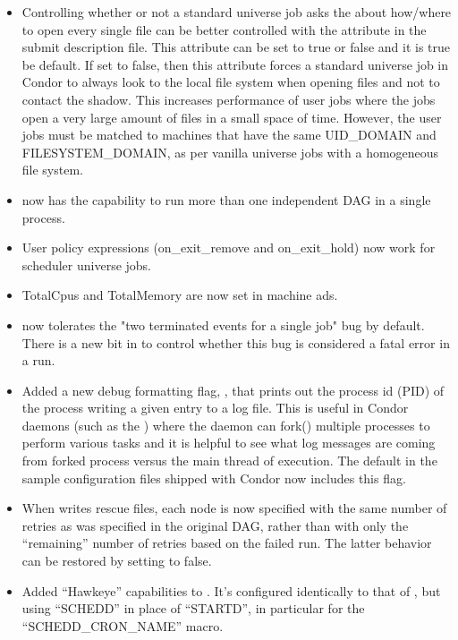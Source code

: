 \begin{itemize}

\item Controlling whether or not a standard universe job asks the
 about how/where to open every single file can be better
controlled with the  attribute in the submit
description file.
This attribute can be set to true or false and it is true be default.
If set to false, then this attribute forces a standard universe job in 
Condor to always look to the local file system when opening files and not
to contact the shadow. 
This increases performance of user jobs where the jobs open a very large
amount of files in a small space of time.
However, the user jobs must be matched to machines that have the same
UID\_DOMAIN and FILESYSTEM\_DOMAIN, as per vanilla universe jobs with a 
homogeneous file system.

\item {} now has the capability to run more than one
independent DAG in a single  process.

\item User policy expressions (on\_exit\_remove and on\_exit\_hold)
now work for scheduler universe jobs.

\item TotalCpus and TotalMemory are now set in machine ads.

\item {} now tolerates the "two terminated events for
a single job" bug by default.  There is a new bit in
 to control whether this bug is considered
a fatal error in a  run.

\item Added a new debug formatting flag, , that prints out
  the process id (PID) of the process writing a given entry to a log
  file.
  This is useful in Condor daemons (such as the ) where 
  the daemon can fork() multiple processes to perform various tasks
  and it is helpful to see what log messages are coming from forked
  process versus the main thread of execution.
  The default  in the sample configuration files
  shipped with Condor now includes this flag.

\item When  writes rescue files, each node is now
specified with the same number of retries as was specified in the
original DAG, rather than with only the ``remaining'' number of
retries based on the failed run.  The latter behavior can be restored
by setting  to false.

\item Added ``Hawkeye'' capabilities to .  It's
configured identically to that of , but using 
``SCHEDD'' in place of ``STARTD'', in particular for the
``SCHEDD\_CRON\_NAME'' macro.

\end{itemize}

